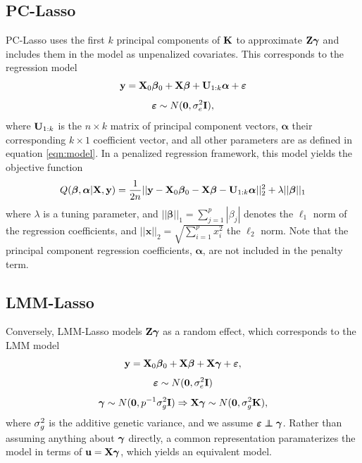 \subsection{PC-Lasso}
PC-Lasso uses the first $k$ principal components of $\textbf{K}$ to approximate $\textbf{Z}\boldsymbol{\gamma}$ and includes them in the model as unpenalized covariates. This corresponds to the regression model
\begin{equation}
    \label{eqn:pca_reg}
    \textbf{y} = \textbf{X}_0\boldsymbol{\beta}{}_0 + \textbf{X}\boldsymbol{\beta}{} + \textbf{U}_{1:k}\boldsymbol{\alpha} + \boldsymbol{\varepsilon}{} 
\end{equation}
$$ \boldsymbol{\varepsilon}{} \sim N(\boldsymbol{0}, \sigma^2_e \textbf{I}), $$
where $\textbf{U}_{1:k}$ is the $n \times k$ matrix of principal component vectors, $\boldsymbol{\alpha}$ their corresponding $k \times 1$ coefficient vector, and all other parameters are as defined in equation \eqref{eqn:model}. In a penalized regression framework, this model yields the objective function
\begin{equation}
    \label{eqn:pca_obj}
    Q(\boldsymbol{\beta}{}, \boldsymbol{\alpha}|\textbf{X}, \textbf{y}) = \frac{1}{2n} ||\textbf{y} - \textbf{X}_0\boldsymbol{\beta}{}_0 - \textbf{X} \boldsymbol{\beta}{}- \textbf{U}_{1:k}\boldsymbol{\alpha}||_2^2 + \lambda || \boldsymbol{\beta}{} ||_1
\end{equation}
where $\lambda$ is a tuning parameter, and $|| \boldsymbol{\beta} ||_1 = \sum_{j=1}^p |\beta_j|$ denotes the $\ell_1$ norm of the regression coefficients, and $||\mathbf{x}||_2 = \sqrt{\sum_{i=1}^p x_i^2}$ the $\ell_2$ norm. Note that the principal component regression coefficients, $\boldsymbol{\alpha}$, are not included in the penalty term. 

\subsection{LMM-Lasso}
\label{sec:lmmlasso}

Conversely, LMM-Lasso models $\textbf{Z}\boldsymbol{\gamma}$ as a random effect, which corresponds to the LMM model
\begin{equation}
    \label{eqn:lmm_reg}
    \textbf{y} = \textbf{X}_0\boldsymbol{\beta}{}_0 + \textbf{X}\boldsymbol{\beta}{} + \textbf{X}\boldsymbol{\gamma}+ \boldsymbol{\varepsilon}{},
\end{equation}
$$ \boldsymbol{\varepsilon}{} \sim N(\boldsymbol{0}, \sigma^2_e \textbf{I}) $$
$$ \boldsymbol{\gamma} \sim N(\boldsymbol{0}, p^{-1} \sigma^2_g \textbf{I}) \Rightarrow \textbf{X} \boldsymbol{\gamma} \sim N(\boldsymbol{0}, \sigma^2_g \textbf{K}), $$
where $\sigma^2_g$ is the additive genetic variance, and we assume $\beps \independent \bgamma$. Rather than assuming anything about $\boldsymbol{\gamma}$ directly, a common representation paramaterizes the model in terms of $\textbf{u}=\textbf{X}\boldsymbol{\gamma}$, which yields an equivalent model. 

